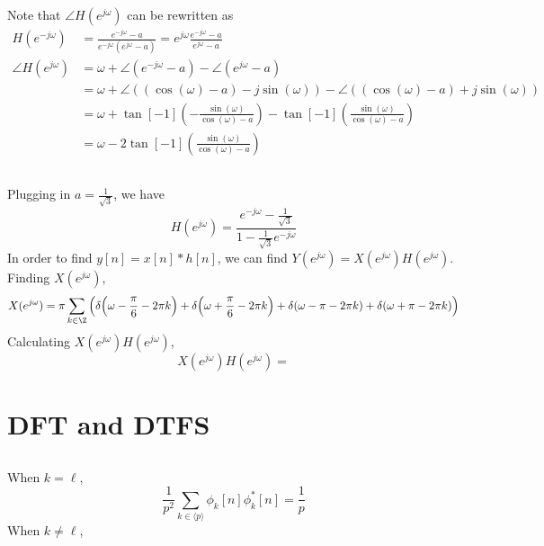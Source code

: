 \documentclass{article}
\begin{document}
\subsection{}

Note that \(\angle H(e^{j \omega})\) can be rewritten as
\begin{align}
    H(e^{-j \omega}) &= \frac{e^{-j \omega} - a}{e^{-j \omega} (e^{j \omega} - a)} = e^{j \omega} \frac{e^{-j \omega} - a}{e^{j \omega} - a}\\
    \angle H(e^{j \omega}) &= \omega + \angle(e^{-j \omega} - a) - \angle(e^{j \omega} - a) \\
    &= \omega + \angle((\cos(\omega) - a) - j \sin(\omega)) - \angle ((\cos(\omega) - a) + j \sin(\omega)) \\
    &= \omega + \tan[-1](-\frac{\sin(\omega)}{\cos(\omega) - a}) - \tan[-1](\frac{\sin(\omega)}{\cos(\omega) - a}) \\
    &= \omega - 2\tan[-1](\frac{\sin(\omega)}{\cos(\omega) - a})
\end{align}

\subsection{}

Plugging in \(a = \frac{1}{\sqrt{3}}\), we have
\begin{equation}
    H(e^{j \omega}) = \frac{e^{-j \omega} - \frac{1}{\sqrt{3}}}{1 - \frac{1}{\sqrt{3}} e^{-j \omega}}
\end{equation}
In order to find \(y[n] = x[n] \ast h[n]\), we can find \(Y(e^{j \omega}) = X(e^{j \omega}) H(e^{j \omega})\).
Finding \(X(e^{j \omega})\),
\begin{equation}
    X(e^{j \omega}) = \pi \sum_{k \in \Z} \qty(\delta\qty(\omega - \frac{\pi}{6} - 2\pi k) + \delta\qty(\omega + \frac{\pi}{6} - 2\pi k) + \delta(\omega - \pi - 2\pi k) + \delta(\omega + \pi - 2\pi k))
\end{equation}
Calculating \(X(e^{j \omega}) H(e^{j \omega})\),
\begin{equation}
    X(e^{j \omega}) H(e^{j \omega}) = 
\end{equation}

\section{DFT and DTFS}

\subsection{}

When \(k = \ell\),
\begin{equation}
    \frac{1}{p^2} \sum_{k \in \langle p \rangle} \phi_k[n] \phi_k^\ast[n] = \frac{1}{p}
\end{equation}
When \(k \neq \ell\),
\end{document}
